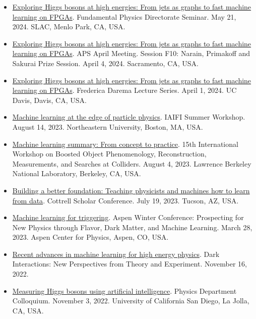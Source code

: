 \documentclass[11pt]{res}
\begin{document}
\begin{resume}
  \begin{itemize}
    \itemsep-0.3em
    \item \href{https://indico.slac.stanford.edu/event/8784/}{Exploring Higgs bosons at high energies: From jets as graphs to fast machine learning on FPGAs}. Fundamental Physics Directorate Seminar. May 21, 2024. SLAC, Menlo Park, CA, USA.
    \item \href{https://meetings.aps.org/Meeting/APR24/Session/F10.2}{Exploring Higgs bosons at high energies: From jets as graphs to fast machine learning on FPGAs}. APS April Meeting. Session F10: Narain, Primakoff and Sakurai Prize Session. April 4, 2024. Sacramento, CA, USA.
    \item \href{https://daremalectures.physics.ucdavis.edu/speakers/}{Exploring Higgs bosons at high energies: From jets as graphs to fast machine learning on FPGAs}. Frederica Darema Lecture Series. April 1, 2024. UC Davis, Davis, CA, USA.
    \item \href{https://iaifi.org/summer-workshop.html}{Machine learning at the edge of particle physics}. IAIFI Summer Workshop. August 14, 2023. Northeastern University, Boston, MA, USA.
    \item \href{https://indico.physics.lbl.gov/event/975/contributions/8195/}{Machine learning summary: From concept to practice}. 15th International Workshop on Boosted Object Phenomenology, Reconstruction, Measurements, and Searches at Colliders. August 4, 2023. Lawrence Berkeley National Laboratory, Berkeley, CA, USA.
    \item \href{https://rescorp.org/cottrell-scholars/cottrell-scholars-conference}{Building a better foundation: Teaching physicists and machines how to learn from data}. Cottrell Scholar Conference. July 19, 2023. Tucson, AZ, USA.
    \item \href{https://indico.fnal.gov/event/21471/contributions/259113/}{Machine learning for triggering}. Aspen Winter Conference: Prospecting for New Physics through Flavor, Dark Matter, and Machine Learning. March 28, 2023. Aspen Center for Physics, Aspen, CO, USA.
    \item \href{https://indico.cern.ch/event/1211501/contributions/5128872/}{Recent advances in machine learning for high energy physics}. Dark Interactions: New Perspectives from Theory and Experiment. November 16, 2022.
    \item \href{https://indico.cern.ch/event/1219204/}{Measuring Higgs bosons using artificial intelligence}. Physics Department Colloquium. November 3, 2022. University of California San Diego, La Jolla, CA, USA.

\end{itemize}
\end{resume}
\end{document}
